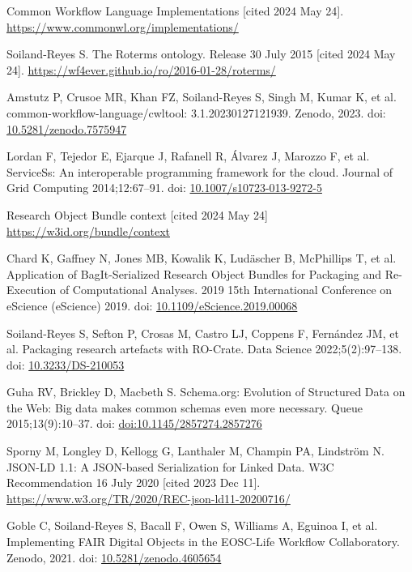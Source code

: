 \documentclass[10pt,letterpaper]{article}
\begin{document}
\begin{thebibliography}{10}
\begin{small}
Common Workflow Language Implementations [cited 2024 May 24].
\url{https://www.commonwl.org/implementations/}

Soiland-Reyes S.
The Roterms ontology. Release 30 July 2015 [cited 2024 May 24].
\url{https://wf4ever.github.io/ro/2016-01-28/roterms/}

Amstutz P, Crusoe MR, Khan FZ, Soiland-Reyes S, Singh M, Kumar K, et al.
common-workflow-language/cwltool: 3.1.20230127121939.
Zenodo, 2023.
doi: \href{https://doi.org/10.5281/zenodo.7575947}{10.5281/zenodo.7575947}

Lordan F, Tejedor E, Ejarque J, Rafanell R, Álvarez J, Marozzo F, et al.
ServiceSs: An interoperable programming framework for the cloud.
Journal of Grid Computing 2014;12:67--91.
doi: \href{https://doi.org/10.1007/s10723-013-9272-5}{10.1007/s10723-013-9272-5}

Research Object Bundle context [cited 2024 May 24]
\url{https://w3id.org/bundle/context}

Chard K, Gaffney N, Jones MB, Kowalik K, Ludäscher B, McPhillips T, et al.
Application of BagIt-Serialized Research Object Bundles for Packaging and Re-Execution of Computational Analyses.
2019 15th International Conference on eScience (eScience) 2019.
doi: \href{https://doi.org/10.1109/eScience.2019.00068}{10.1109/eScience.2019.00068}

Soiland-Reyes S, Sefton P, Crosas M, Castro LJ, Coppens F, Fernández JM, et al.
Packaging research artefacts with RO-Crate.
Data Science 2022;5(2):97--138.
doi: \href{https://doi.org/10.3233/DS-210053}{10.3233/DS-210053}

Guha RV, Brickley D, Macbeth S.
Schema.org: Evolution of Structured Data on the Web: Big data makes common schemas even more necessary.
Queue 2015;13(9):10--37.
doi: \href{https://doi.org/doi:10.1145/2857274.2857276}{doi:10.1145/2857274.2857276}

Sporny M, Longley D, Kellogg G, Lanthaler M, Champin PA, Lindström N.
JSON-LD 1.1: A JSON-based Serialization for Linked Data.
W3C Recommendation 16 July 2020 [cited 2023 Dec 11].
\url{https://www.w3.org/TR/2020/REC-json-ld11-20200716/}

Goble C, Soiland-Reyes S, Bacall F, Owen S, Williams A, Eguinoa I, et al.
Implementing FAIR Digital Objects in the EOSC-Life Workflow Collaboratory.
Zenodo, 2021.
doi: \href{https://doi.org/10.5281/zenodo.4605654}{10.5281/zenodo.4605654}


\end{small}
\end{thebibliography}
\end{document}
